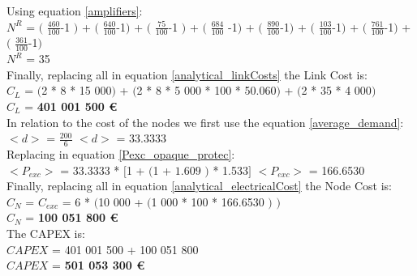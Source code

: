 Using equation \ref{amplifiers}:\\

$N^R$ = $($ $\frac{460}{100}$-1 $)$ + $($ $\frac{640}{100}$-1$)$ + $($ $\frac{75}{100}$-1 $)$ + $($ $\frac{684}{100}$ -1$)$ + $($ $\frac{890}{100}$-1$)$ + $($ $\frac{103}{100}$-1$)$ + $($ $\frac{761}{100}$-1$)$ + $($ $\frac{361}{100}$-1$)$\\

$N^R$ = 35\\

Finally, replacing all in equation \ref{analytical_linkCosts} the Link Cost is:\\

$C_L$ = $($2 * 8 * 15 000$)$ + $($2 * 8 * 5 000 * 100 * 50.060$)$ + $($2 * 35 * 4 000$)$\\

$C_L$ = \textbf{401 001 500 \euro}\\

In relation to the cost of the nodes we first use the equation \ref{average_demand}:\\

$<d>$ = $\frac{200}{6}$ \qquad \qquad $<d>$ = 33.3333\\

Replacing in equation \ref{Pexc_opaque_protec}:\\

$<P_{exc}>$ = 33.3333 * $[$1 + $($1 + $1.609$ $)$ * 1.533$]$ \qquad \quad $<P_{exc}>$ = 166.6530 \\

Finally, replacing all in equation \ref{analytical_electricalCost} the Node Cost is:\\

$C_N$ = $C_{exc}$ = 6 * $($10 000 + $($1 000 * 100 * 166.6530 $)$ $)$\\

$C_N$ = \textbf{100 051 800 \euro}\\

The CAPEX is:\\
$CAPEX$ = 401 001 500 + 100 051 800\\

$CAPEX$ = \textbf{501 053 300 \euro}\\

